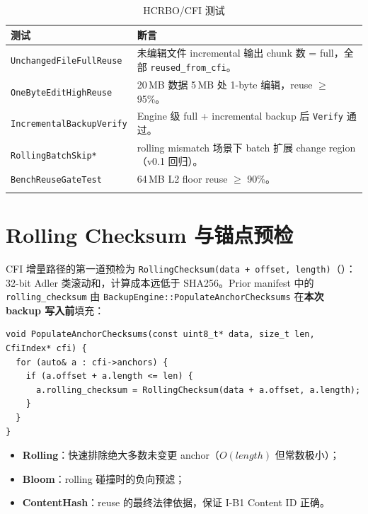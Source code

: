 \begin{longtable}{@{}p{4.8cm}p{9.2cm}@{}}
\toprule
\textbf{测试} & \textbf{断言} \\
\midrule
\endhead
\texttt{UnchangedFileFullReuse} &
  未编辑文件 incremental 输出 chunk 数 = full，全部 \texttt{reused\_from\_cfi}。 \\
\texttt{OneByteEditHighReuse} &
  20\,MB 数据 5\,MB 处 1-byte 编辑，reuse $\geq$ 95\%。 \\
\texttt{IncrementalBackupVerify} &
  Engine 级 full + incremental backup 后 \texttt{Verify} 通过。 \\
\texttt{RollingBatchSkip*} &
  rolling mismatch 场景下 batch 扩展 change region（v0.1 回归）。 \\
\texttt{BenchReuseGateTest} &
  64\,MB L2 floor reuse $\geq$ 90\%。 \\
\bottomrule
\caption{HCRBO/CFI 测试}
\label{tab:hcrbo-tests}
\end{longtable}

\section{Rolling Checksum 与锚点预检}
\label{sec:rolling-checksum}

CFI 增量路径的第一道预检为 \texttt{RollingChecksum(data + offset, length)}（）：32-bit Adler 类滚动和，计算成本远低于 SHA256。Prior manifest 中的 \texttt{rolling\_checksum} 由 \texttt{BackupEngine::PopulateAnchorChecksums} 在\textbf{本次 backup 写入前}填充：

\begin{lstlisting}[caption={PopulateAnchorChecksums（\filepath{backup\_engine.cc}）},label={lst:populate-rolling}]
void PopulateAnchorChecksums(const uint8_t* data, size_t len, CfiIndex* cfi) {
  for (auto& a : cfi->anchors) {
    if (a.offset + a.length <= len) {
      a.rolling_checksum = RollingChecksum(data + a.offset, a.length);
    }
  }
}
\end{lstlisting}

\begin{designbox}
\begin{itemize}[nosep]
  \item \textbf{Rolling}：快速排除绝大多数未变更 anchor（$O(\mathit{length})$ 但常数极小）；
  \item \textbf{Bloom}：rolling 碰撞时的负向预滤；
  \item \textbf{ContentHash}：reuse 的最终法律依据，保证 I-B1 Content ID 正确。
\end{itemize}
\end{designbox}

